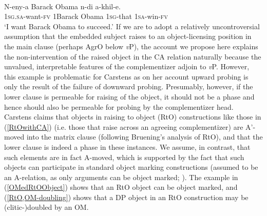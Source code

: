 \documentclass[output=paper
,modfonts
,nonflat
]{langsci/langscibook}
\begin{document}
\ea	\label{RtOwithCA}
 \\
\gll N-eny-a Barack Obama n-di a-khil-e.\\
1\textsc{sg}.\textsc{sa}-want-\textsc{fv} 1Barack Obama 1\textsc{sg}-that 1\textsc{sa}-win-\textsc{fv}\\
\glt `I want Barack Obama to succeed.'
\z
\noindent If we are to adopt a relatively uncontroversial assumption that the embedded subject raises to an object-licensing position in the main clause (perhaps AgrO below \textit{v}P), the account we propose here explains the non-intervention of the raised object in the CA relation naturally because the unvalued, interpretable features of the complementizer adjoin to \textit{v}P. However, this example is problematic for Carstens as on her account upward probing is only the result of the failure of downward probing. Presumably, however, if the lower clause is permeable for raising of the object, it should not be a phase and hence should also be permeable for probing by the complementizer head. Carstens claims that objects in raising to object (RtO) constructions like those in (\ref{RtOwithCA}) (i.e. those that raise across an agreeing complementizer) are A’-moved into the matrix clause (following Bruening's \citeyear{Bruening:2001} analysis of RtO), and that the lower clause is indeed a phase in these instances. We assume, in contrast, that such elements are in fact A-moved, which is supported by the fact that such objects can participate in standard object marking constructions (assumed to be an A-relation, as only arguments can be object marked; \citealt{Diercks:2011,SikukuEt:2017}). The example in (\ref{OMedRtOObject}) shows that an RtO object can be object marked, and (\ref{RtO,OM-doubling}) shows that a DP object in an RtO construction may be (clitic-)doubled by an OM.%

\ea
{} \\
\end{document}
